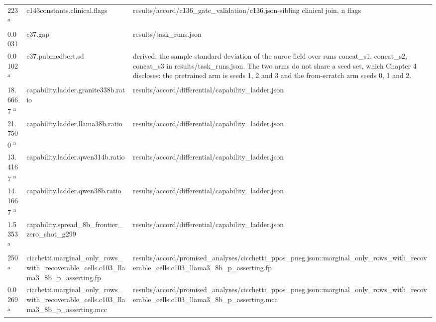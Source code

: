 \begin{longtable}{@{}p{0.7in}p{1.9in}p{2.6in}@{}}
223 \textsuperscript{a} & c143constants.\allowbreak{}clinical.\allowbreak{}flags & results/\allowbreak{}accord/\allowbreak{}c136\_gate\_validation/\allowbreak{}c136.\allowbreak{}json-sibling clinical join, n flags\\
0.0031 & c37.\allowbreak{}gap & results/\allowbreak{}task\_runs.\allowbreak{}json\\
0.0102 \textsuperscript{a} & c37.\allowbreak{}pubmedbert.\allowbreak{}sd & derived: the sample standard deviation of the auroc field over runs concat\_s1, concat\_s2, concat\_s3 in results/\allowbreak{}task\_runs.\allowbreak{}json.\allowbreak{} The two arms do not share a seed set, which Chapter 4 discloses: the pretrained arm is seeds 1, 2 and 3 and the from-scratch arm seeds 0, 1 and 2.\allowbreak{}\\
18.6667 \textsuperscript{a} & capability.\allowbreak{}ladder.\allowbreak{}granite338b.\allowbreak{}ratio & results/\allowbreak{}accord/\allowbreak{}differential/\allowbreak{}capability\_ladder.\allowbreak{}json\\
21.7500 \textsuperscript{a} & capability.\allowbreak{}ladder.\allowbreak{}llama38b.\allowbreak{}ratio & results/\allowbreak{}accord/\allowbreak{}differential/\allowbreak{}capability\_ladder.\allowbreak{}json\\
13.4167 \textsuperscript{a} & capability.\allowbreak{}ladder.\allowbreak{}qwen314b.\allowbreak{}ratio & results/\allowbreak{}accord/\allowbreak{}differential/\allowbreak{}capability\_ladder.\allowbreak{}json\\
14.1667 \textsuperscript{a} & capability.\allowbreak{}ladder.\allowbreak{}qwen38b.\allowbreak{}ratio & results/\allowbreak{}accord/\allowbreak{}differential/\allowbreak{}capability\_ladder.\allowbreak{}json\\
1.5353 \textsuperscript{a} & capability.\allowbreak{}spread\_8b\_frontier\_zero\_shot\_g299 & results/\allowbreak{}accord/\allowbreak{}differential/\allowbreak{}capability\_ladder.\allowbreak{}json\\
250 \textsuperscript{a} & cicchetti.\allowbreak{}marginal\_only\_rows\_with\_recoverable\_cells.\allowbreak{}c103\_llama3\_8b\_p\_asserting.\allowbreak{}fp & results/\allowbreak{}accord/\allowbreak{}promised\_analyses/\allowbreak{}cicchetti\_ppos\_pneg.\allowbreak{}json::marginal\_only\_rows\_with\_recoverable\_cells.\allowbreak{}c103\_llama3\_8b\_p\_asserting.\allowbreak{}fp\\
0.0269 \textsuperscript{a} & cicchetti.\allowbreak{}marginal\_only\_rows\_with\_recoverable\_cells.\allowbreak{}c103\_llama3\_8b\_p\_asserting.\allowbreak{}mcc & results/\allowbreak{}accord/\allowbreak{}promised\_analyses/\allowbreak{}cicchetti\_ppos\_pneg.\allowbreak{}json::marginal\_only\_rows\_with\_recoverable\_cells.\allowbreak{}c103\_llama3\_8b\_p\_asserting.\allowbreak{}mcc\\

\end{longtable}
